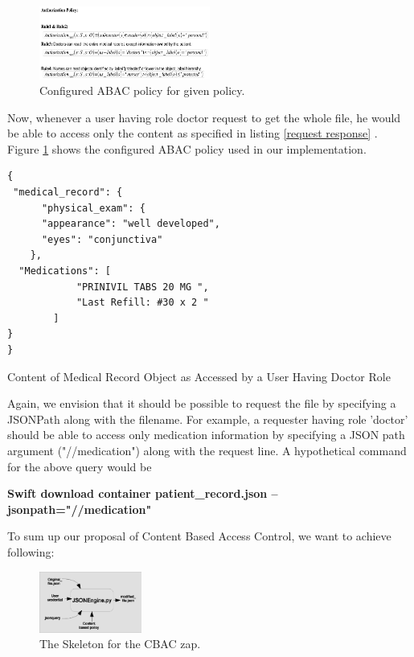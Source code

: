 \begin{figure}[h!]
  \centering
    \includegraphics[width=0.5\textwidth]{eps/policy}
 \caption{Configured ABAC policy for given policy.}
\label {fig:policy} 
\end{figure}


Now, whenever a user having role doctor request to get the whole file, he would be able to access only the content as specified in listing \ref{request response} . Figure \ref{fig:policy} shows the configured ABAC policy used in our implementation.

\begin{listing}
\begin{verbatim}
{
 "medical_record": { 
      "physical_exam": {
	  "appearance": "well developed",
	  "eyes": "conjunctiva"
	},
  "Medications": [
            "PRINIVIL TABS 20 MG ",
            "Last Refill: #30 x 2 "
        ]   
}  
}

\end{verbatim}
\caption{Content of  Medical Record Object as Accessed by a User Having Doctor Role} 
\label{request response}
\end{listing}


Again, we envision that it should  be possible to request the file by specifying a JSONPath along with the filename. For example, a requester having role 'doctor' should be able to access only   medication information by specifying a JSON path argument ("//medication") along with the request line. A hypothetical command for the above query would be 

\textbf{ Swift download container patient\_record.json --jsonpath="//medication" }


To sum up our proposal of Content Based Access Control, we want to achieve following:

\begin{figure}[h!] 
  \centering
    \includegraphics[width=0.3\textwidth]{eps/json_query_zap}
 \caption{The Skeleton for the CBAC zap.}
\label{fig:zappskeleton}
\end{figure}

